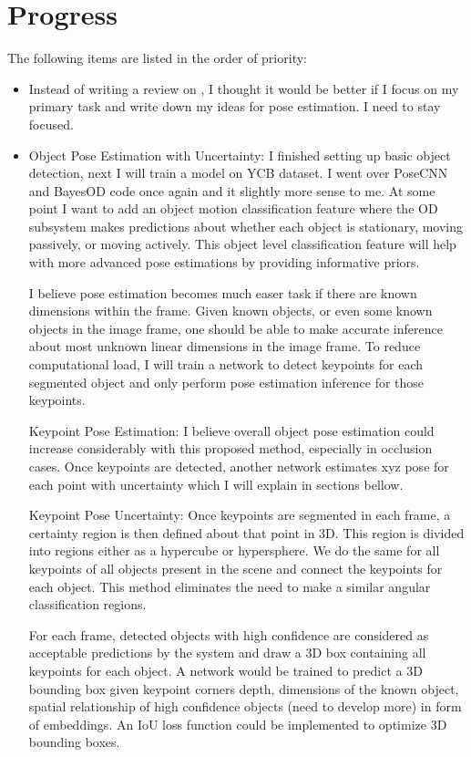 \documentclass[11pt]{article}
\begin{document}
\section{Progress}
The following items are listed in the order of priority:
\begin{itemize}
      \item Instead of writing a review on \cite{pinto2016curious}, I thought
      it would be better if I focus on my primary task and write down my ideas
      for pose estimation. I need to stay focused.
      \item Object Pose Estimation with Uncertainty: I finished setting up
      basic object detection, next I will train a
      model on YCB dataset. I went over PoseCNN and BayesOD code once again and
      it slightly more sense to me. At some point I want to add an object motion
      classification feature where
      the OD subsystem makes predictions about whether each object is
      stationary, moving passively, or moving actively. This object level
      classification feature will help with more advanced pose estimations by
      providing informative priors.

      I believe pose estimation becomes much easer task if there are known
      dimensions within the frame. Given known objects, or even some known
      objects in the image frame, one should be able to make accurate inference
      about most unknown linear dimensions in the image frame. To reduce
      computational load, I will train a network to detect keypoints for each
      segmented object and only perform pose estimation inference for those
      keypoints.

      Keypoint Pose Estimation:
      I believe overall object pose estimation could increase considerably with
      this proposed method, especially in occlusion cases. Once keypoints are
      detected, another network estimates xyz pose for each point with
      uncertainty which I will explain in sections bellow.

      Keypoint Pose Uncertainty:
      Once keypoints are segmented in each frame, a certainty region is then
      defined about that point in 3D. This region is divided into regions
      either as a hypercube or hypersphere. We do the same for all keypoints
      of all objects present in the scene and connect the keypoints for each
      object. This method eliminates the need to make a similar angular
      classification regions.

      For each frame, detected objects with high confidence are considered as
      acceptable predictions by the system and draw a 3D box containing all
      keypoints for each object. A network would be trained to predict a 3D bounding
      box given keypoint corners depth, dimensions of the known object, spatial
      relationship of high confidence objects (need to develop more) in form
      of embeddings. An IoU loss function \cite{yu2016unitbox} could be
      implemented to optimize 3D bounding boxes.


\end{itemize}
\end{document}
